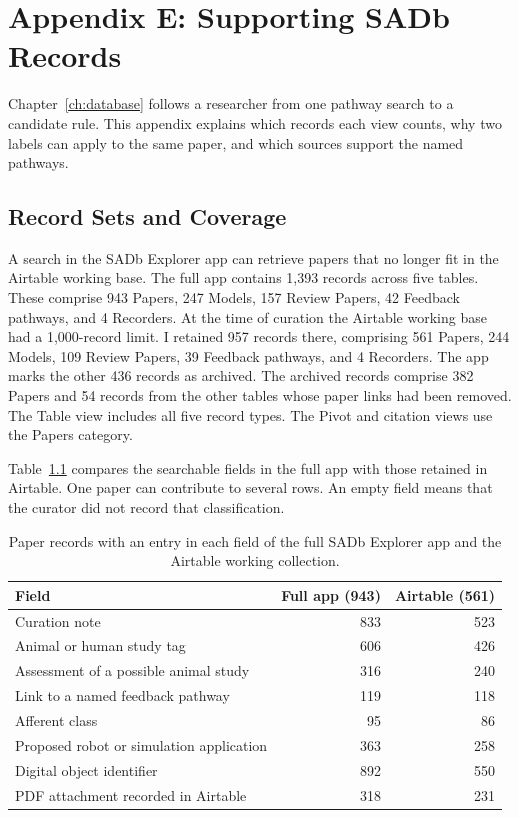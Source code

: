 \chapter{Appendix E: Supporting SADb Records}\label{app:sadb_records}
\graphicspath{{../Figures/96-AppendixE/}{figs/96-AppendixE/}}

Chapter~\ref{ch:database} follows a researcher from one pathway search to a candidate rule. This appendix explains which records each view counts, why two labels can apply to the same paper, and which sources support the named pathways.

\section{Record Sets and Coverage}

A search in the SADb Explorer app can retrieve papers that no longer fit in the Airtable working base. The full app contains 1,393 records across five tables. These comprise 943 Papers, 247 Models, 157 Review Papers, 42 Feedback pathways, and 4 Recorders. At the time of curation the Airtable working base had a 1,000-record limit. I retained 957 records there, comprising 561 Papers, 244 Models, 109 Review Papers, 39 Feedback pathways, and 4 Recorders. The app marks the other 436 records as archived. The archived records comprise 382 Papers and 54 records from the other tables whose paper links had been removed. The Table view includes all five record types. The Pivot and citation views use the Papers category.

Table~\ref{tab:sadb_field_coverage} compares the searchable fields in the full app with those retained in Airtable. One paper can contribute to several rows. An empty field means that the curator did not record that classification.

\begin{table}[htbp]
\centering
\caption{Paper records with an entry in each field of the full SADb Explorer app and the Airtable working collection.}
\label{tab:sadb_field_coverage}
\begin{tabular}{@{}lrr@{}}
\toprule
\textbf{Field} & \textbf{Full app (943)} & \textbf{Airtable (561)} \\
\midrule
Curation note & 833 & 523 \\
Animal or human study tag & 606 & 426 \\
Assessment of a possible animal study & 316 & 240 \\
Link to a named feedback pathway & 119 & 118 \\
Afferent class & 95 & 86 \\
Proposed robot or simulation application & 363 & 258 \\
Digital object identifier & 892 & 550 \\
PDF attachment recorded in Airtable & 318 & 231 \\
\bottomrule
\end{tabular}
\end{table}

